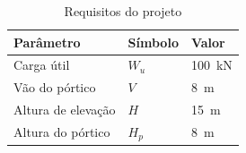 \begin{table}[H]
  \centering
  \caption{Requisitos do projeto}
  \label{tab:dados_de_entrada}
  \begin{tabularx}{\textwidth}{>{\centering\arraybackslash}X>{\centering\arraybackslash}X>{\centering\arraybackslash}X}
    \toprule
    Parâmetro          & Símbolo & Valor                  \\
    \midrule
    Carga útil         & $W_u$   & \SI{100}{\kilo\newton} \\
    Vão do pórtico     & $V$     & \SI{8}{\meter}         \\
    Altura de elevação & $H$     & \SI{15}{\meter}        \\
    Altura do pórtico  & $H_p$   & \SI{8}{\meter}         \\
    \bottomrule
  \end{tabularx}
\end{table}

